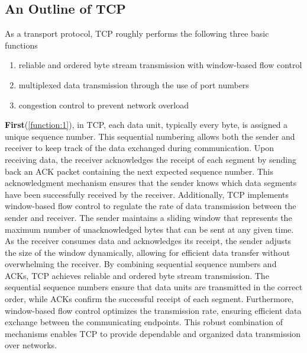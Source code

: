 \subsection{An Outline of TCP}

As a transport protocol, TCP roughly performs the following three basic functions
\begingroup
\renewcommand\labelenumi{(\theenumi)}
\begin{enumerate}
\item reliable and ordered byte stream transmission with window-based flow control \label{function:1}
\item multiplexed data transmission through the use of port numbers \label{function:2}
\item congestion control to prevent network overload \label{function:3}
\end{enumerate}
\endgroup

\textbf{First}(\ref{function:1}), in TCP, each data unit, typically every byte, is assigned a unique sequence number. This sequential numbering allows both the sender and receiver to keep track of the data exchanged during communication. Upon receiving data, the receiver acknowledges the receipt of each segment by sending back an ACK packet containing the next expected sequence number. This acknowledgment mechanism ensures that the sender knows which data segments have been successfully received by the receiver. Additionally, TCP implements window-based flow control to regulate the rate of data transmission between the sender and receiver. The sender maintains a sliding window that represents the maximum number of unacknowledged bytes that can be sent at any given time. As the receiver consumes data and acknowledges its receipt, the sender adjusts the size of the window dynamically, allowing for efficient data transfer without overwhelming the receiver. By combining sequential sequence numbers and ACKs, TCP achieves reliable and ordered byte stream transmission. The sequential sequence numbers ensure that data units are transmitted in the correct order, while ACKs confirm the successful receipt of each segment. Furthermore, window-based flow control optimizes the transmission rate, ensuring efficient data exchange between the communicating endpoints. This robust combination of mechanisms enables TCP to provide dependable and organized data transmission over networks.

